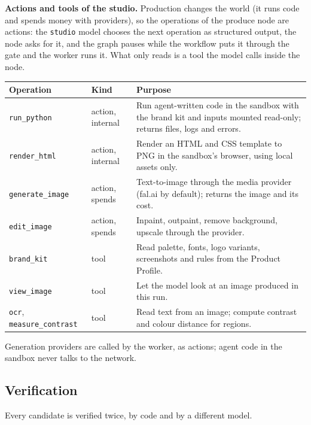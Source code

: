 \documentclass[11pt,a4paper]{article}
\begin{document}
\textbf{Actions and tools of the studio.} Production changes the world (it runs code and spends money with providers), so the operations of the produce node are actions: the \texttt{studio} model chooses the next operation as structured output, the node asks for it, and the graph pauses while the workflow puts it through the gate and the worker runs it. What only reads is a tool the model calls inside the node.
\begin{longtable}{@{}p{3.6cm}p{2.4cm}p{9.3cm}@{}}
\toprule
\textbf{Operation} & \textbf{Kind} & \textbf{Purpose}\\
\midrule
\endhead
\texttt{run\_python} & action, internal & Run agent-written code in the sandbox with the brand kit and inputs mounted read-only; returns files, logs and errors.\\
\texttt{render\_html} & action, internal & Render an HTML and CSS template to PNG in the sandbox's browser, using local assets only.\\
\texttt{generate\_image} & action, spends & Text-to-image through the media provider (fal.ai by default); returns the image and its cost.\\
\texttt{edit\_image} & action, spends & Inpaint, outpaint, remove background, upscale through the provider.\\
\texttt{brand\_kit} & tool & Read palette, fonts, logo variants, screenshots and rules from the Product Profile.\\
\texttt{view\_image} & tool & Let the model look at an image produced in this run.\\
\texttt{ocr}, \texttt{measure\_contrast} & tool & Read text from an image; compute contrast and colour distance for regions.\\
\bottomrule
\end{longtable}
Generation providers are called by the worker, as actions; agent code in the sandbox never talks to the network.

\subsection{Verification}
Every candidate is verified twice, by code and by a different model.
\end{document}
